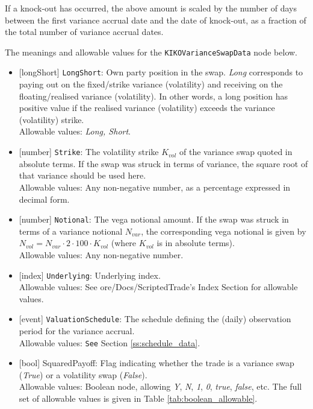 If a knock-out has occurred, the above amount is scaled by the number of days between the first variance
accrual date and the date of knock-out, as a fraction of the total number of variance accrual dates.

The meanings and allowable values for the \lstinline!KIKOVarianceSwapData! node below.

\begin{itemize}
  \item{}[longShort] \lstinline!LongShort!: Own party position in the swap. \emph{Long} corresponds to paying out on the
  fixed/strike variance (volatility) and receiving on the floating/realised variance (volatility). In other words,
  a long position has positive value if the realised variance (volatility) exceeds the variance (volatility)
  strike. \\
  Allowable values: \emph{Long, Short}.
  \item{}[number] \lstinline!Strike!: The volatility strike $K_{vol}$ of the variance swap quoted in absolute terms.
  If the swap was struck in terms of variance, the square root of that variance should be used here. \\
  Allowable values: Any non-negative number, as a percentage expressed in decimal form.
  \item{}[number] \lstinline!Notional!: The vega notional amount. If the swap was struck in terms of a variance notional
  $N_{var}$, the corresponding vega notional is given by $N_{vol} = N_{var} \cdot 2 \cdot 100 \cdot K_{vol}$ (where
  $K_{vol}$ is in absolute terms). \\
  Allowable values: Any non-negative number.
  \item{}[index] \lstinline!Underlying!: Underlying index. \\
  Allowable values: See ore/Docs/ScriptedTrade's Index Section for allowable values.
  \item{}[event] \lstinline!ValuationSchedule!: The schedule defining the (daily) observation period for the variance accrual. \\
  Allowable values: \lstinline!See! Section \ref{ss:schedule_data}.
  \item{}[bool] SquaredPayoff: Flag indicating whether the trade is a variance swap (\emph{True}) or a volatility
  swap (\emph{False}). \\
  Allowable values: Boolean node, allowing \emph{Y}, \emph{N}, \emph{1}, \emph{0}, \emph{true}, \emph{false}, etc.
  The full set of allowable values is given in Table \ref{tab:boolean_allowable}.

\end{itemize}
